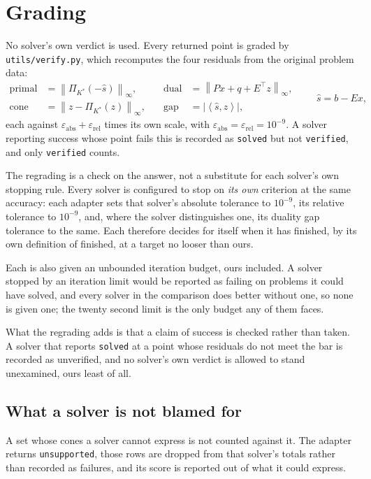 \documentclass[a4paper,11pt]{book}
\theoremstyle{plain}
\theoremstyle{definition}
\theoremstyle{remark}
\numberwithin{equation}{chapter}
\numberwithin{algorithm}{chapter}
\newcommand{\proj}[2]{\Pi_{#2}\!\left(#1\right)}
\newcommand{\norm}[1]{\left\|#1\right\|}
\newcommand{\inner}[2]{\left\langle #1, #2 \right\rangle}
\begin{document}
	\section{Grading}

	No solver's own verdict is used. Every returned point is graded by
	\texttt{utils/verify.py}, which recomputes the four residuals from the
	original problem data:
	\[
	\begin{aligned}
		\text{primal} &=\norm{\proj{-\widehat s}{K^*}}_\infty,
		&\quad
		\text{dual} &=\norm{Px+q+E^{\top}z}_\infty,\\
		\text{cone} &=\norm{z-\proj{z}{K^*}}_\infty,
		&\quad
		\text{gap} &=\bigl|\inner{\widehat s}{z}\bigr| ,
	\end{aligned}
	\qquad \widehat s=b-Ex ,
	\]
	each against $\varepsilon_{\mathrm{abs}}+\varepsilon_{\mathrm{rel}}$ times its
	own scale, with $\varepsilon_{\mathrm{abs}}=\varepsilon_{\mathrm{rel}}=
	10^{-9}$. A solver reporting success whose point fails this is recorded as
	\texttt{solved} but not \texttt{verified}, and only \texttt{verified} counts.

	The regrading is a check on the answer, not a substitute for each solver's own
	stopping rule. Every solver is configured to stop on \emph{its own} criterion
	at the same accuracy: each adapter sets that solver's absolute tolerance to
	$10^{-9}$, its relative tolerance to $10^{-9}$, and, where the solver
	distinguishes one, its duality gap tolerance to the same. Each therefore
	decides for itself when it has finished, by its own definition of finished, at
	a target no looser than ours.

	Each is also given an unbounded iteration budget, ours included. A solver
	stopped by an iteration limit would be reported as failing on problems it
	could have solved, and every solver in the comparison does better without
	one, so none is given one; the twenty second limit is the only budget any of
	them faces.

	What the regrading adds is that a claim of success is checked rather than
	taken. A solver that reports \texttt{solved} at a point whose residuals do not
	meet the bar is recorded as unverified, and no solver's own verdict is allowed
	to stand unexamined, ours least of all.

	\subsection{What a solver is not blamed for}

	A set whose cones a solver cannot express is not counted against it. The
	adapter returns \texttt{unsupported}, those rows are dropped from that
	solver's totals rather than recorded as failures, and its score is reported
	out of what it could express. 
\end{document}
